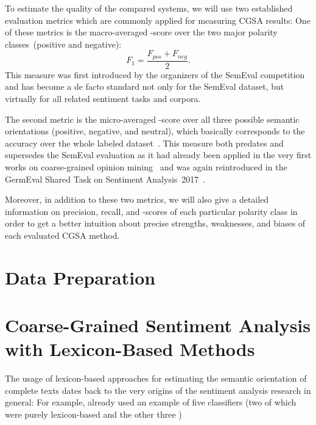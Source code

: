 To estimate the quality of the compared systems, we will use two
established evaluation metrics which are commonly applied for
measuring CGSA results: One of these metrics is the macro-averaged
\F-score over the two major polarity classes~(positive and negative):
{ \small%
  \begin{equation*}
    F_1 = \frac{F_{pos} + F_{neg}}{2}.
  \end{equation*}%
  \normalsize%
}%
This measure was first introduced by the organizers of the SemEval
competition~\cite{Nakov:13,Rosenthal:14,Rosenthal:15} and has become a
de facto standard not only for the SemEval dataset, but virtually for
all related sentiment tasks and corpora.

The second metric is the micro-averaged \F-score over all three
possible semantic orientations (positive, negative, and neutral),
which basically corresponds to the accuracy over the whole labeled
dataset~\cite[cf.][p.~577]{Manning:99}.  This measure both predates
and supersedes the SemEval evaluation as it had already been applied
in the very first works on coarse-grained opinion
mining~\cite{Wiebe:99,Das:01,Read:05,Kennedy:06,Go:09} and was again
reintroduced in the GermEval Shared Task on Sentiment
Analysis~2017~\cite{Biemann:17}.

Moreover, in addition to these two metrics, we will also give a
detailed information on precision, recall, and \F-scores of each
particular polarity class in order to get a better intuition about
precise strengths, weaknesses, and biases of each evaluated CGSA
method.

\section{Data Preparation}\label{sec:cgsa:data}

\section{Coarse-Grained Sentiment Analysis with Lexicon-Based
  Methods}\label{sec:cgsa:lexicon-based}

The usage of lexicon-based approaches for estimating the semantic
orientation of complete texts dates back to the very origins of the
sentiment analysis research in general: For example, \citet{Das:01}
already used an example of five classifiers (two of which were purely
lexicon-based and the other three )


